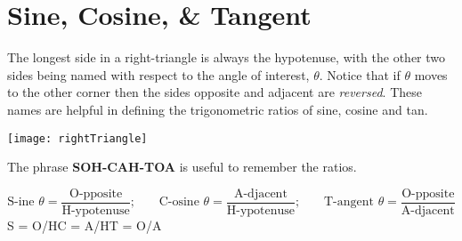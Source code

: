 \section*{Sine, Cosine, \& Tangent}
\begin{multicols}{2}
The longest side in a right-triangle is always the hypotenuse, with the other two sides being named with respect to the angle of interest, $\theta$. Notice that if $\theta$ moves to the other corner then the sides opposite and adjacent are \textit{reversed}. These names are helpful in defining the trigonometric ratios of sine, cosine and tan.
\columnbreak
\begin{center}
	\texttt{[image: rightTriangle]}
\end{center}
\end{multicols}

The phrase \textbf{SOH-CAH-TOA} is useful to remember the ratios.
\begin{tcolorbox}
\begin{equation*}\text{S-ine }  \theta  =\frac{\text{O-pposite}}{\text{H-ypotenuse}}\text{;}\qquad\text{C-osine }  \theta  =\frac{\text{A-djacent}}{\text{H-ypotenuse}}\text{;}\qquad\text{T-angent }  \theta  =\frac{\text{O-pposite}}{\text{A-djacent}}
\end{equation*}\medskip
\hspace{1.7cm}S = O/H\hspace{3.5cm}C = A/H\hspace{3.8cm}T = O/A
\end{tcolorbox}

